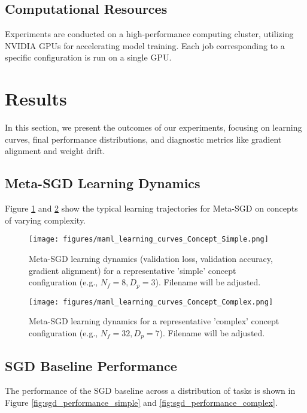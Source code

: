 \documentclass[11pt, a4paper]{article}
\begin{document}
\subsection{Computational Resources}
Experiments are conducted on a high-performance computing cluster, utilizing NVIDIA GPUs for accelerating model training. Each job corresponding to a specific configuration is run on a single GPU.

\section{Results}
\label{sec:results}

In this section, we present the outcomes of our experiments, focusing on learning curves, final performance distributions, and diagnostic metrics like gradient alignment and weight drift.

\subsection{Meta-SGD Learning Dynamics}
Figure \ref{fig:metasgd_learning_curves_simple} and \ref{fig:metasgd_learning_curves_complex} show the typical learning trajectories for Meta-SGD on concepts of varying complexity.

\begin{figure}[H]
    \centering
    \texttt{[image: figures/maml\_learning\_curves\_Concept\_Simple.png]} 
    \caption{Meta-SGD learning dynamics (validation loss, validation accuracy, gradient alignment) for a representative 'simple' concept configuration (e.g., $N_f=8, D_p=3$). Filename will be adjusted.}
    \label{fig:metasgd_learning_curves_simple}
\end{figure}

\begin{figure}[H]
    \centering
    \texttt{[image: figures/maml\_learning\_curves\_Concept\_Complex.png]}
    \caption{Meta-SGD learning dynamics for a representative 'complex' concept configuration (e.g., $N_f=32, D_p=7$). Filename will be adjusted.}
    \label{fig:metasgd_learning_curves_complex}
\end{figure}

\subsection{SGD Baseline Performance}
The performance of the SGD baseline across a distribution of tasks is shown in Figure \ref{fig:sgd_performance_simple} and \ref{fig:sgd_performance_complex}.
\end{document}
